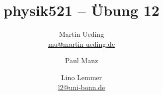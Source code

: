

\title{physik521 – Übung 12}
\author{
	Martin Ueding \\ \small{\href{mailto:mu@martin-ueding.de}{mu@martin-ueding.de}}
        \and Paul Manz
        \and Lino Lemmer \\ \small{\href{mailto:l2@uni-bonn.de}{l2@uni-bonn.de}}
}

\pagestyle{plain}

\newcommand\kB{k_\text B}
\newcommand\muB{\mu_\text B}



\maketitle

\section{}

\fehlt

\section{}

\fehlt

\section{}

\fehlt

\IfFileExists{\bibliographyfile}{
    \printbibliography
}{}



